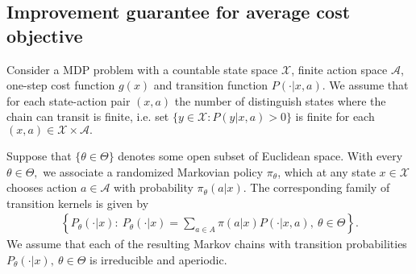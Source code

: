 \documentclass[11pt]{article}
\newcommand{\R}{\mathbb{R}}
\newcommand{\X}{\mathcal{X}}
\newcommand{\A}{\mathcal{A}}
\newcommand{\V}{\mathbb{V}}
\theoremstyle{definition}
\numberwithin{equation}{section}
\begin{document}
%
%

%
%



 \subsection{Improvement guarantee for average cost objective}\label{sec:TRPOforAC}

Consider a MDP problem with a countable state space $\X$, finite action space $\A$, one-step cost function $g(x)$ and  transition function $P(\cdot|x, a)$. We assume that for each state-action pair $(x, a)$ the number of distinguish states where the chain can transit is finite, i.e. set $\{y\in \X: P(y| x, a)>0\}$ is finite for each $(x, a)\in \X\times \A.$


Suppose that $\{\theta\in \Theta\}$ denotes some open subset of Euclidean space. With every $\theta\in \Theta,$ we associate a randomized Markovian policy $\pi_{\theta}$, which at any state $x\in \X$ chooses action $a\in \A$ with probability $\pi_\theta(a|x)$. The corresponding family of  transition kernels is given by
\begin{align*}\left\{P_\theta(\cdot|x) :~P_\theta(\cdot|x) = \sum\limits_{a\in A} \pi(a|x)P(\cdot|x, a),~ \theta\in \Theta\right\}.\end{align*} 
We assume that each of the resulting Markov chains with transition probabilities $P_{\theta}(\cdot|x),~\theta\in \Theta$ is irreducible and aperiodic.
\end{document}

